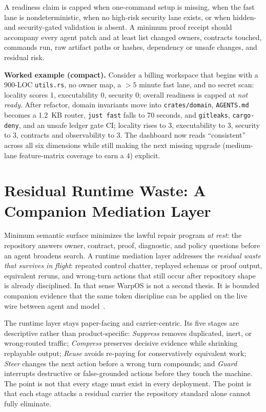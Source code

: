 \documentclass[conference]{IEEEtran}
\begin{document}
A readiness claim is capped when one-command setup is missing, when the fast lane is nondeterministic, when no high-risk security lane exists, or when hidden- and security-gated validation is absent. A minimum proof receipt should accompany every agent patch and at least list changed owners, contracts touched, commands run, raw artifact paths or hashes, dependency or unsafe changes, and residual risk.

\noindent\textbf{Worked example (compact).} Consider a billing workspace that begins with a 900-LOC \texttt{utils.rs}, no owner map, a $>5$ minute fast lane, and no secret scan: locality scores 1, executability 0, security 0; overall readiness is capped at \emph{not ready}. After refactor, domain invariants move into \texttt{crates/domain}, \texttt{AGENTS.md} becomes a 1.2~KB router, \texttt{just fast} falls to 70 seconds, and \texttt{gitleaks}, \texttt{cargo-deny}, and an unsafe ledger gate CI; locality rises to 3, executability to 3, security to 3, contracts and observability to 3. The dashboard now reads ``consistent'' across all six dimensions while still making the next missing upgrade (medium-lane feature-matrix coverage to earn a 4) explicit.

\section{Residual Runtime Waste: A Companion Mediation Layer}
\label{sec:runtime}
Minimum semantic surface minimizes the lawful repair program \emph{at rest}: the repository answers owner, contract, proof, diagnostic, and policy questions before an agent broadens search. A runtime mediation layer addresses the \emph{residual waste that survives in flight}: repeated control chatter, replayed schemas or proof output, equivalent reruns, and wrong-turn actions that still occur after repository shape is already disciplined. In that sense WarpOS is not a second thesis. It is bounded companion evidence that the same token discipline can be applied on the live wire between agent and model~\cite{mitmproxy2026,warposTelemetryArchitecture2026,warposFiveAgentCorpus2026,warposInterventionCatalog2026}.

The runtime layer stays paper-facing and carrier-centric. Its five stages are descriptive rather than product-specific: \emph{Suppress} removes duplicated, inert, or wrong-routed traffic; \emph{Compress} preserves decisive evidence while shrinking replayable output; \emph{Reuse} avoids re-paying for conservatively equivalent work; \emph{Steer} changes the next action before a wrong turn compounds; and \emph{Guard} interrupts destructive or false-grounded actions before they touch the machine. The point is not that every stage must exist in every deployment. The point is that each stage attacks a residual carrier the repository standard alone cannot fully eliminate.
\end{document}

